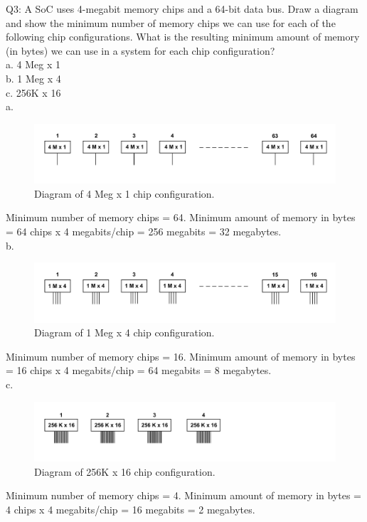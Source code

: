 \documentclass[a4paper]{article}
\begin{document}
Q3: A SoC uses 4-megabit memory chips and a 64-bit data bus. Draw a diagram and show the minimum number of memory chips we can use for each of the following chip configurations. What is the resulting minimum amount of memory (in bytes) we can use in a system for each chip configuration?\\
a. 4 Meg x 1\\
b. 1 Meg x 4\\
c. 256K x 16\\
a.
\begin{figure}[H]
    \centering
    \includegraphics[width=1\textwidth]{3-a.pdf}
    \caption{Diagram of 4 Meg x 1 chip configuration.\protect\footnotemark[1]}
\end{figure}
Minimum number of memory chips = 64. Minimum amount of memory in bytes = 64 chips x 4 megabits/chip = 256 megabits = 32 megabytes.\\
b.
\begin{figure}[H]
    \centering
    \includegraphics[width=1\textwidth]{3-b.pdf}
    \caption{Diagram of 1 Meg x 4 chip configuration.}
\end{figure}
Minimum number of memory chips = 16. Minimum amount of memory in bytes = 16 chips x 4 megabits/chip = 64 megabits = 8 megabytes.\\
c.
\begin{figure}[H]
    \centering
    \includegraphics[width=1\textwidth]{3-c.pdf}
    \caption{Diagram of 256K x 16 chip configuration.}
\end{figure}
Minimum number of memory chips = 4. Minimum amount of memory in bytes = 4 chips x 4 megabits/chip = 16 megabits = 2 megabytes.
\end{document}
